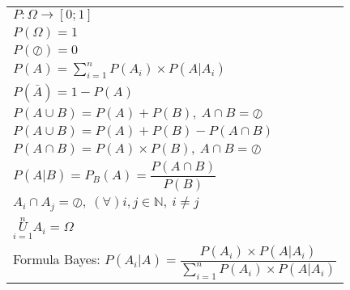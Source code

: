 \documentclass{article}
\begin{document}
\begin{tabular}{l}
  $P:\Omega \rightarrow [0; 1]$                                                                              \\
  $P(\Omega) = 1$                                                                                            \\
  $P(\oslash) = 0$                                                                                           \\
  $P(A) = \sum\limits_{i = 1}^{n} P(A_i) \times P(A|A_i)$                                                    \\
  $P(\bar{A})  = 1 - P(A)$                                                                                   \\
  $P(A \cup B)  = P(A) + P(B),\ A \cap B = \oslash$                                                          \\
  $P(A \cup B)  = P(A) + P(B) - P(A \cap B)$                                                                 \\
  $P(A \cap B) = P(A) \times P(B),\ A \cap B = \oslash$                                                      \\
  $P(A|B) = P_B(A) = \dfrac{P(A \cap B)}{P(B)}$                                                              \\
  $ A_i \cap A_j = \oslash,\ ( \forall ) i, j \in \mathbb{N},\ i\neq j  $                                    \\
  $\underset{i=1}{\overset{n}{U}} A_i = \Omega$                                                              \\
  Formula Bayes: $P(A_i|A) = \dfrac{P(A_i) \times P(A|A_i)}{\sum\limits_{i = 1}^{n} P(A_i) \times P(A|A_i)}$ \\
\end{tabular}
\end{document}
